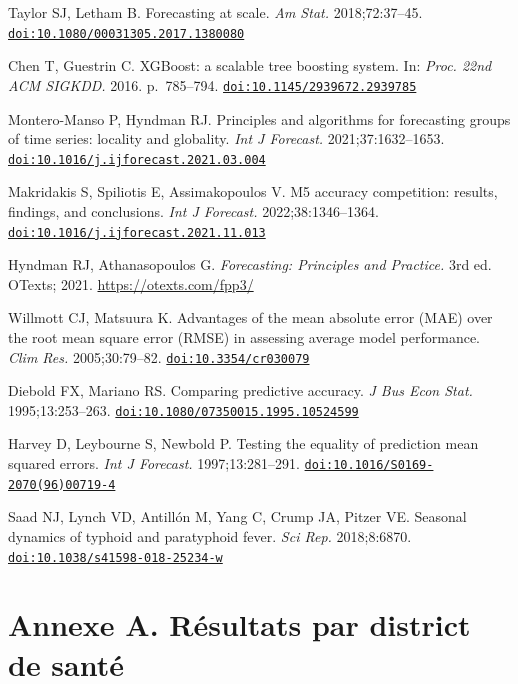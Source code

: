 \documentclass[11pt]{article}
\begin{document}
\begin{enumerate}[label={[\arabic*]},leftmargin=2.2em,itemsep=0.5pt]
\item\hypertarget{ref19}{}Taylor SJ, Letham B. Forecasting at scale. \textit{Am Stat.} 2018;72:37--45. \href{https://doi.org/10.1080/00031305.2017.1380080}{\nolinkurl{doi:10.1080/00031305.2017.1380080}}
\item\hypertarget{ref20}{}Chen T, Guestrin C. XGBoost: a scalable tree boosting system. In: \textit{Proc. 22nd ACM SIGKDD.} 2016. p.~785--794. \href{https://doi.org/10.1145/2939672.2939785}{\nolinkurl{doi:10.1145/2939672.2939785}}
\item\hypertarget{ref21}{}Montero-Manso P, Hyndman RJ. Principles and algorithms for forecasting groups of time series: locality and globality. \textit{Int J Forecast.} 2021;37:1632--1653. \href{https://doi.org/10.1016/j.ijforecast.2021.03.004}{\nolinkurl{doi:10.1016/j.ijforecast.2021.03.004}}
\item\hypertarget{ref22}{}Makridakis S, Spiliotis E, Assimakopoulos V. M5 accuracy competition: results, findings, and conclusions. \textit{Int J Forecast.} 2022;38:1346--1364. \href{https://doi.org/10.1016/j.ijforecast.2021.11.013}{\nolinkurl{doi:10.1016/j.ijforecast.2021.11.013}}
\item\hypertarget{ref23}{}Hyndman RJ, Athanasopoulos G. \textit{Forecasting: Principles and Practice.} 3rd ed. OTexts; 2021. \url{https://otexts.com/fpp3/}
\item\hypertarget{ref24}{}Willmott CJ, Matsuura K. Advantages of the mean absolute error (MAE) over the root mean square error (RMSE) in assessing average model performance. \textit{Clim Res.} 2005;30:79--82. \href{https://doi.org/10.3354/cr030079}{\nolinkurl{doi:10.3354/cr030079}}
\item\hypertarget{ref25}{}Diebold FX, Mariano RS. Comparing predictive accuracy. \textit{J Bus Econ Stat.} 1995;13:253--263. \href{https://doi.org/10.1080/07350015.1995.10524599}{\nolinkurl{doi:10.1080/07350015.1995.10524599}}
\item\hypertarget{ref26}{}Harvey D, Leybourne S, Newbold P. Testing the equality of prediction mean squared errors. \textit{Int J Forecast.} 1997;13:281--291. \href{https://doi.org/10.1016/S0169-2070(96)00719-4}{\nolinkurl{doi:10.1016/S0169-2070(96)00719-4}}
\item\hypertarget{ref27}{}Saad NJ, Lynch VD, Antillón M, Yang C, Crump JA, Pitzer VE. Seasonal dynamics of typhoid and paratyphoid fever. \textit{Sci Rep.} 2018;8:6870. \href{https://doi.org/10.1038/s41598-018-25234-w}{\nolinkurl{doi:10.1038/s41598-018-25234-w}}
\end{enumerate}


\section*{Annexe A. Résultats par district de santé}

\end{document}
